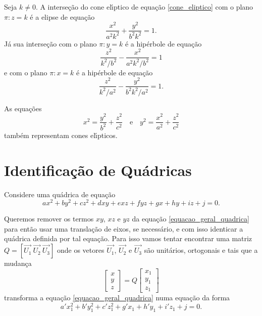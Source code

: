 Seja $k \ne 0$. A interse\c{c}\~ao do cone el{\'\i}ptico de equa\c{c}\~ao \eqref{cone_eliptico} com o plano $\pi : z = k$ \'e a elipse de equa\c{c}\~ao
\[
	\dfrac{x^2}{a^2k^2} + \dfrac{y^2}{b^2k^2} = 1.
\]
J\'a sua interse\c{c}\~ao com o plano $\pi : y = k$ \'e a hip\'erbole de equa\c{c}\~ao
\[
	\dfrac{z^2}{k^2/b^2} - \dfrac{x^2}{a^2k^2/b^2} = 1
\]
e com o plano $\pi : x = k$ \'e a hip\'erbole de equa\c{c}\~ao
\[
	\dfrac{z^2}{k^2/a^2} - \dfrac{y^2}{b^2k^2/a^2} = 1.
\]

As equa\c{c}\~oes
\[
	x^2 = \dfrac{y^2}{b^2} + \dfrac{z^2}{c^2}\quad \mbox{e}\quad y^2 = \dfrac{x^2}{a^2} + \dfrac{z^2}{c^2}
\]
tamb\'em representam cones el{\'\i}pticos.

\section{Identifica\c{c}\~ao de Qu\'adricas} %
\label{sec:identificacao_de_quadricas}

Considere uma qu\'adrica de equa\c{c}\~ao
\begin{equation}\label{equacao_geral_quadrica}
  ax^2 + by^2 + cz^2 + dxy + exz + fyz + gx + hy + iz + j = 0.
\end{equation}

Queremos remover os termos $xy$, $xz$ e $yz$ da equa\c{c}\~ao \eqref{equacao_geral_quadrica} para ent\~ao usar uma transla\c{c}\~ao de eixos, se necess\'ario, e com isso identicar a qu\'adrica definida por tal equa\c{c}\~ao. Para isso vamos tentar encontrar uma matriz $Q = [\vec{U_1}\ \vec{U_2}\ \vec{U_3}]$ onde os vetores $\vec{U_1}$, $\vec{U_2}$ e $\vec{U_3}$ s\~ao unit\'arios, ortogonais e tais que a mudan\c{c}a
\begin{equation}\label{substituicao_quadrica}
	\begin{bmatrix}
		x\\
		y\\
		z
	\end{bmatrix} = Q \begin{bmatrix}
		x_1\\
		y_1\\
		z_1
	\end{bmatrix}
\end{equation}
transforma a equa\c{c}\~ao \eqref{equacao_geral_quadrica} numa equa\c{c}\~ao da forma
\begin{equation}\label{equacao_rotacionada_quadrica}
  a'x_1^2 + b'y_1^2 + c'z_1^2 + g'x_1 + h'y_1 + i'z_1 + j = 0.
\end{equation}

